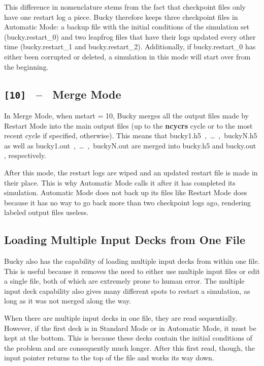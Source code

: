 This difference in nomenclature stems from the fact that checkpoint files only have one restart log a piece.  Bucky therefore keeps three checkpoint files in Automatic Mode: a backup file with the initial conditions of the simulation set (bucky.restart\_0) and two leapfrog files that have their logs updated every other time (bucky.restart\_1 and bucky.restart\_2).  Additionally, if bucky.restart\_0 has either been corrupted or deleted, a simulation in this mode will start over from the beginning.  

\subsection{\texttt{[10]} \ -- \ Merge Mode  }

In Merge Mode, when mstart = 10, Bucky merges all the output files made by Restart Mode into the main output files (up to the \textbf{ncycrs} cycle or to the most recent cycle if specified, otherwise).  This means that \mbox{bucky1.h5 , \ldots \ , buckyN.h5} as well as \mbox{bucky1.out , \ldots \ , buckyN.out} are merged into bucky.h5 and bucky.out , respectively. 

After this mode, the restart logs are wiped and an updated restart file is made in their place.  This is why Automatic Mode calls it after it has completed its simulation.  Automatic Mode does not back up its files like Restart Mode does because it has no way to go back more than two checkpoint logs ago, rendering labeled output files useless.

\subsection{Loading Multiple Input Decks from One File }

Bucky also has the capability of loading multiple input decks from within one file.  This is useful because it removes the need to either use multiple input files or edit a single file, both of which are extremely prone to human error.  The multiple input deck capability also gives many different spots to restart a simulation, as long as it was not merged along the way.

When there are multiple input decks in one file, they are read sequentially. However, if the first deck is in Standard Mode or in Automatic Mode, it must be kept at the bottom.  This is because these decks contain the initial conditions of the problem and are consequently much longer.  After this first read, though, the input pointer returns to the top of the file and works its way down.

